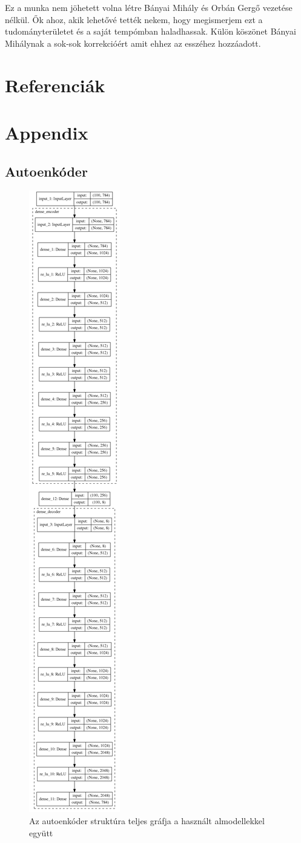 \documentclass[12pt, english]{article}
\begin{document}
\par Ez a munka nem jöhetett volna létre Bányai Mihály és Orbán Gergő vezetése nélkül. Ők ahoz, akik lehetővé tették nekem, hogy megismerjem ezt a tudományterületet és a saját tempómban haladhassak. Külön köszönet Bányai Mihálynak a sok-sok korrekcióért amit ehhez az esszéhez hozzáadott. 

\newpage

\section*{Referenciák}
\label{sec:references}
\printbibliography[heading=none]

\appendix
\section*{Appendix}
\label{sec:appendix}

\subsection*{Autoenkóder}
\label{sec:auto-encoder}

\begin{figure}[H]
    \centering
    \includegraphics[width=0.12\linewidth]{DenseAutoEncoder_vertical.png} 
    \caption{Az autoenkóder struktúra teljes gráfja a használt almodellekkel együtt} 
    \label{fig:sűrű-auto-encoder}
\end{figure}
\end{document}
